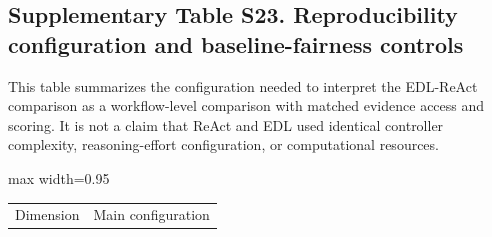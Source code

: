 \documentclass[
  8pt,
]{extarticle}
\begin{document}
\hypertarget{supplementary-table-s23-reproducibility-configuration-and-baseline-fairness-controls}{%
\subsection{Supplementary Table S23. Reproducibility configuration and
baseline-fairness
controls}\label{supplementary-table-s23-reproducibility-configuration-and-baseline-fairness-controls}}

This table summarizes the configuration needed to interpret the
EDL-ReAct comparison as a workflow-level comparison with matched
evidence access and scoring. It is not a claim that ReAct and EDL used
identical controller complexity, reasoning-effort configuration, or
computational resources.

\begin{center}
\begin{adjustbox}{max width=0.95\textwidth}
\begin{tabular}{@{}
ll@{}}
\toprule\noalign{}
Dimension & Main configuration \\


\end{tabular}
\end{adjustbox}
\end{center}
\end{document}
